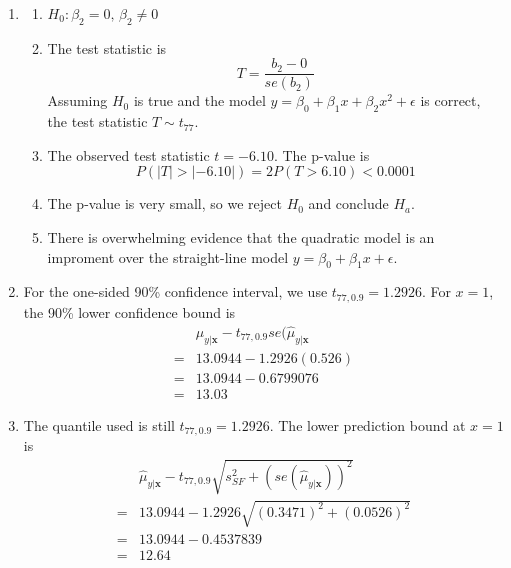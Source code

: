 \documentclass{article}\usepackage[]{graphicx}\usepackage[]{color}
\begin{document}
\begin{enumerate}
\begin{enumerate}
	\item
	\begin{enumerate}[label = \arabic*.]
	\item
	$H_0: \beta_2 = 0,\, \beta_2 \neq 0$
	\item
	The test statistic is
	\[T = \frac{b_2 - 0}{se(b_2)}\]
	Assuming $H_0$ is true and the model $y = \beta_0 + \beta_1 x + \beta_2 x^2 + \epsilon$ is correct, the test statistic $T \sim t_{77}$.
	\item
	The observed test statistic $t = -6.10$. The p-value is 
	\[P(|T| > |-6.10|) = 2P(T > 6.10) < 0.0001\]
	\item
	The p-value is very small, so we reject $H_0$ and conclude $H_a$.
	\item
	There is overwhelming evidence that the quadratic model is an improment over the straight-line model $y = \beta_0 + \beta_1 x + \epsilon$.
	\end{enumerate}
	
	\item
	For the one-sided 90\% confidence interval, we use $t_{77, 0.9} = 1.2926$. For $x = 1$, the 90\% lower confidence bound is
	\begin{align*}
  &\hat{\mu}_{y|\bm x} - t_{77, 0.9} se(\hat{\mu}_{y|\bm x}\\
  =&  13.0944 - 1.2926 (0.526)\\
  =& 13.0944 - 0.6799076 \\
  =& 13.03
  \end{align*}
	
	\item
	The quantile used is still $t_{77, 0.9} = 1.2926$. The lower prediction bound at $x = 1$ is
	\begin{align*}
  &\hat{\mu}_{y|\bm x} - t_{77, 0.9} \sqrt{s_{SF}^2 + (se(\hat{\mu}_{y|\bm x}))^2}\\
  =&  13.0944 - 1.2926 \sqrt{(0.3471)^2 + (0.0526)^2}\\
  =& 13.0944 - 0.4537839 \\
  =& 12.64
  \end{align*}
	\end{enumerate}
\end{enumerate}
% 
%
\end{document}
